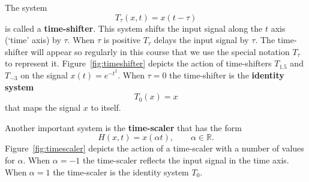 \documentclass[11pt,a4paper]{book}
\theoremstyle{plain}
\numberwithin{equation}{section}
\newcommand{\reals}{{\mathbb R}}
\newcommand{\term}{\textbf}
\newcommand{\vtick}[1]{\draw (#1,-0.075) -- (#1,0.075) }
\begin{document}
The system
\[
T_\tau(x,t) = x(t - \tau)
\]
is called a \term{time-shifter}.  This system shifts the input signal along the $t$ axis (`time' axis) by $\tau$.  When $\tau$ is positive $T_{\tau}$ delays the input signal by $\tau$.  The time-shifter will appear so regularly in this course that we use the special notation $T_\tau$ to represent it.  Figure~\ref{fig:timeshifter} depicts the action of time-shifters $T_{1.5}$ and $T_{-3}$ on the signal $x(t) = e^{-t^2}$.  When $\tau=0$ the time-shifter is the \term{identity system}
\[
T_0(x) = x
\]
that maps the signal $x$ to itself.

Another important system is the \term{time-scaler} that has the form
\[
H(x,t) = x(\alpha t), \qquad \alpha \in \reals.
\]
Figure~\ref{fig:timescaler} depicts the action of a time-scaler with a number of values for $\alpha$.  When $\alpha=-1$ the time-scaler reflects the input signal in the time axis.  When $\alpha = 1$ the time-scaler is the identity system $T_0$.


\end{document}
